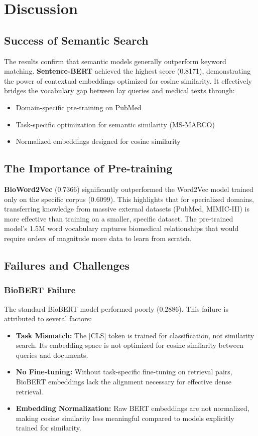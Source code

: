 \documentclass[sigconf,nonacm]{acmart}
\begin{document}
\section{Discussion}

\subsection{Success of Semantic Search}
The results confirm that semantic models generally outperform keyword matching. \textbf{Sentence-BERT} achieved the highest score (0.8171), demonstrating the power of contextual embeddings optimized for cosine similarity. It effectively bridges the vocabulary gap between lay queries and medical texts through:
\begin{itemize}
    \item Domain-specific pre-training on PubMed
    \item Task-specific optimization for semantic similarity (MS-MARCO)
    \item Normalized embeddings designed for cosine similarity
\end{itemize}

\subsection{The Importance of Pre-training}
\textbf{BioWord2Vec} (0.7366) significantly outperformed the Word2Vec model trained only on the specific corpus (0.6099). This highlights that for specialized domains, transferring knowledge from massive external datasets (PubMed, MIMIC-III) is more effective than training on a smaller, specific dataset. The pre-trained model's 1.5M word vocabulary captures biomedical relationships that would require orders of magnitude more data to learn from scratch.

\subsection{Failures and Challenges}

\subsubsection{BioBERT Failure}
The standard BioBERT model performed poorly (0.2886). This failure is attributed to several factors:
\begin{itemize}
    \item \textbf{Task Mismatch:} The [CLS] token is trained for classification, not similarity search. Its embedding space is not optimized for cosine similarity between queries and documents.
    \item \textbf{No Fine-tuning:} Without task-specific fine-tuning on retrieval pairs, BioBERT embeddings lack the alignment necessary for effective dense retrieval.
    \item \textbf{Embedding Normalization:} Raw BERT embeddings are not normalized, making cosine similarity less meaningful compared to models explicitly trained for similarity.
\end{itemize}
\end{document}
